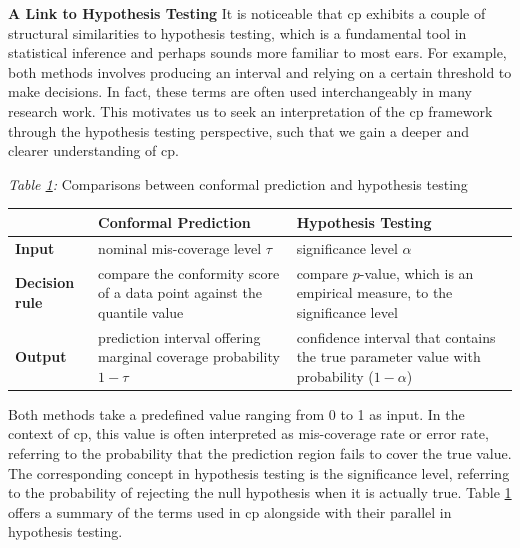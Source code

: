 \vspace{1.5em}
\noindent \textbf{A Link to Hypothesis Testing} It is noticeable that \gls{cp} exhibits a couple of structural similarities to hypothesis testing, which is a fundamental tool in statistical inference and perhaps sounds more familiar to most ears. For example, both methods involves producing an interval and relying on a certain threshold to make decisions. In fact, these terms are often used interchangeably in many research work. This motivates us to seek an interpretation of the \gls{cp} framework through the hypothesis testing perspective, such that we gain a deeper and clearer understanding of \gls{cp}. \vspace{2em}

\begin{table}[h]
    \centering
   	
 	{\small \textit{Table \ref{tab:cpht_comparison}:} Comparisons between conformal prediction and hypothesis testing}
	\vspace{0.7em}

    \renewcommand{\arraystretch}{1.2}
   	\begin{tabular}{| m{1.5cm} | m{6cm} | m{5.8cm} |}
    \hline
    &\textbf{Conformal Prediction} & \textbf{Hypothesis Testing} \\
    \hline
    \textbf{Input} & nominal mis-coverage level $\tau$ & significance level $\alpha$ \\
    \hline
    \textbf{Decision rule} & compare the conformity score of a data point against the quantile value & compare $p$-value, which is an empirical measure, to the significance level \\ 
    \hline
	\textbf{Output} & prediction interval offering marginal coverage probability $1 - \tau$ & confidence interval that contains the true parameter value with probability ($1 - \alpha$)  \\
	\hline        		
    \end{tabular}
    \label{tab:cpht_comparison}
\end{table}
	 
\vspace{0.5em} 	  	
Both methods take a predefined value ranging from 0 to 1 as input. In the context of \gls{cp}, this value is often interpreted as mis-coverage rate or error rate, referring to the probability that the prediction region fails to cover the true value. The corresponding concept in hypothesis testing is the significance level, referring to the probability of rejecting the null hypothesis when it is actually true. Table \ref{tab:cpht_comparison} offers a summary of the terms used in \gls{cp} alongside with their parallel in hypothesis testing.


